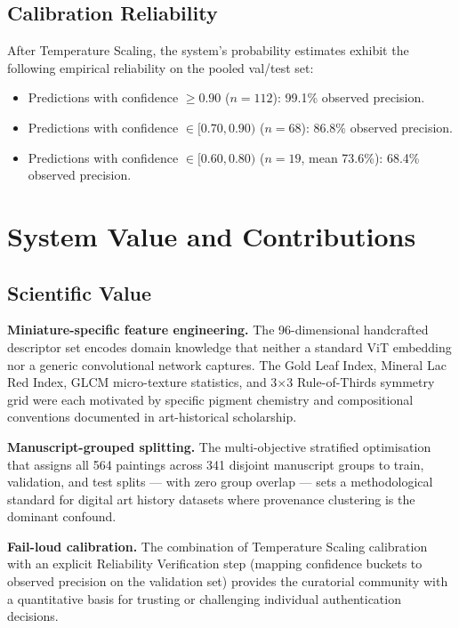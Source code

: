 \documentclass[12pt, a4paper, twoside]{article}
\begin{document}
\subsection{Calibration Reliability}

After Temperature Scaling, the system's probability estimates exhibit the following empirical reliability on the pooled val/test set:

\begin{itemize}
  \item Predictions with confidence $\geq 0.90$ ($n = 112$): 99.1\% observed precision.
  \item Predictions with confidence $\in [0.70, 0.90)$ ($n = 68$): 86.8\% observed precision.
  \item Predictions with confidence $\in [0.60, 0.80)$ ($n = 19$, mean 73.6\%): 68.4\% observed precision.
\end{itemize}

\section{System Value and Contributions}
\label{sec:value}

\subsection{Scientific Value}

\textbf{Miniature-specific feature engineering.} The 96-dimensional handcrafted descriptor set encodes domain knowledge that neither a standard ViT embedding nor a generic convolutional network captures. The Gold Leaf Index, Mineral Lac Red Index, GLCM micro-texture statistics, and 3$\times$3 Rule-of-Thirds symmetry grid were each motivated by specific pigment chemistry and compositional conventions documented in art-historical scholarship.

\textbf{Manuscript-grouped splitting.} The multi-objective stratified optimisation that assigns all 564 paintings across 341 disjoint manuscript groups to train, validation, and test splits — with zero group overlap — sets a methodological standard for digital art history datasets where provenance clustering is the dominant confound.

\textbf{Fail-loud calibration.} The combination of Temperature Scaling calibration with an explicit Reliability Verification step (mapping confidence buckets to observed precision on the validation set) provides the curatorial community with a quantitative basis for trusting or challenging individual authentication decisions.
\end{document}
